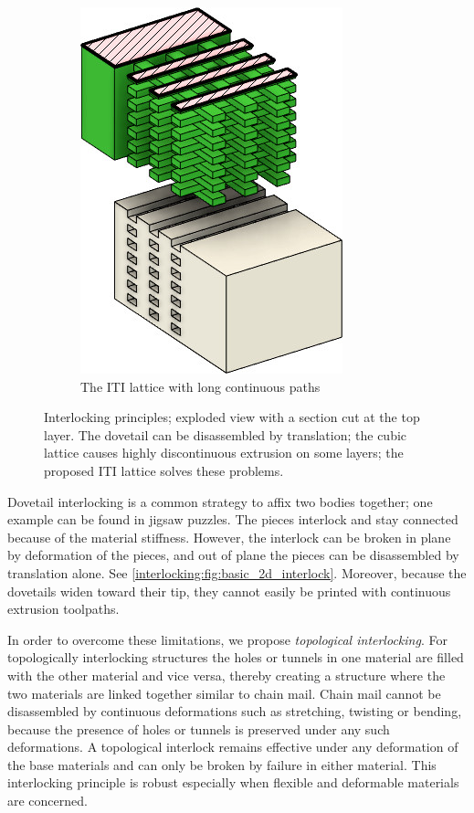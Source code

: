 \begin{figure}
\begin{subfigure}[B]{.36\columnwidth}
		\includegraphics[height=\figheight]{sources-method-basic_lattice.jpg}
		\caption{The ITI lattice with long continuous paths}
		\label{interlocking:fig:basic_structure_single_mat}
	\end{subfigure}
	\caption{Interlocking principles; exploded view with a section cut at the top layer. The dovetail can be disassembled by translation; the cubic lattice causes highly discontinuous extrusion on some layers; the proposed ITI lattice solves these problems.}
	\label{interlocking:fig:basic_structure}
\end{figure}





Dovetail interlocking is a common strategy to affix two bodies together;
one example can be found in jigsaw puzzles.
The pieces interlock and stay connected because of the material stiffness.
However, the interlock can be broken in plane by deformation of the pieces,
and out of plane the pieces can be disassembled by translation alone.
See \cref{interlocking:fig:basic_2d_interlock}.
Moreover, because the dovetails widen toward their tip, they cannot easily be printed with continuous extrusion toolpaths.

In order to overcome these limitations, we propose \emph{topological interlocking}.
For topologically interlocking structures the holes or tunnels in one material are filled with the other material and vice versa,
thereby creating a structure where the two materials are linked together similar to chain mail.
Chain mail cannot be disassembled by continuous deformations such as stretching, twisting or bending,
because the presence of holes or tunnels is preserved under any such deformations.
A topological interlock remains effective under any deformation of the base materials and can only be broken by failure in either material.
This interlocking principle is robust especially when flexible and deformable materials are concerned.

